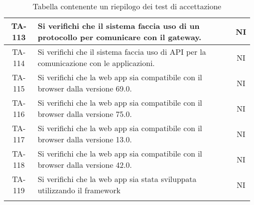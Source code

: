 \begin{center}
\begin{longtable}{|c|p{10cm}|c|}
			 \hline
			 TA-113 & Si verifichi che il sistema faccia uso di un protocollo per comunicare con il gateway. & NI \\
			 \hline
			 TA-114 & Si verifichi che il sistema faccia uso di API per la comunicazione con le applicazioni. & NI \\
			 \hline
			 TA-115 & Si verifichi che la web app sia compatibile con il browser \glock{Firefox} dalla versione 69.0. & NI \\
			 \hline
			 TA-116 & Si verifichi che la web app sia compatibile con il browser \glock{Chrome} dalla versione 75.0. & NI \\
			 \hline
			 TA-117 & Si verifichi che la web app sia compatibile con il browser \glock{Safari} dalla versione 13.0. & NI \\
			 \hline
			 TA-118 & Si verifichi che la web app sia compatibile con il browser \glock{Edge} dalla versione 42.0. & NI \\
			 \hline
			 TA-119 & Si verifichi che la web app sia stata sviluppata utilizzando il framework \glock{Bootstrap} & NI \\
			 \hline

			 \caption{Tabella contenente un riepilogo dei test di accettazione}
			\end{longtable}
		\end{center}
		

